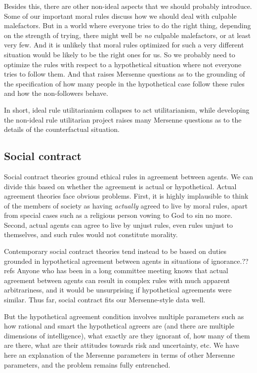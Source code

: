 Besides this, there are other non-ideal aspects that we should probably introduce. Some of our important moral rules discuss how
we should deal with culpable malefactors. But in a world where everyone tries to do the right thing, depending on the strength
of trying, there might well be \textit{no} culpable malefactors, or at least very few. And it is unlikely that moral rules optimized
for such a very different situation would be likely to be the right ones for us. So we probably need to optimize the rules with
respect to a hypothetical situation where not everyone tries to follow them. And that raises Mersenne questions as to 
the grounding of the specification of how many
people in the hypothetical case follow these rules and how the non-followers behave.

In short, ideal rule utilitarianism collapses to act utilitarianism, while developing the non-ideal rule utilitarian project raises many Mersenne questions as to the details of the counterfactual situation.

\subsection{Social contract}
Social contract theories ground ethical rules in agreement between agents.  We can divide this based on whether the agreement 
is actual or hypothetical. Actual agreement theories face obvious problems. First, it is highly implausible to think of the members of society as having \textit{actually} agreed to live by moral rules, apart from special cases such as a religious person vowing to God to sin no more. Second, actual agents can agree to live by unjust rules, even rules unjust to themselves,
and such rules would not constitute morality. 

Contemporary social contract theories tend instead to be based on duties grounded in hypothetical agreement between agents in situations of 
ignorance.??refs Anyone who has been in a long committee meeting knows that actual agreement between agents can result in 
complex rules with much apparent arbitrariness, and it would be unsurprising if hypothetical agreements were similar. Thus far, 
social contract fits our Mersenne-style data well. 

But the hypothetical agreement condition involves multiple parameters such as how rational and smart the hypothetical agreers are (and there are
multiple dimensions of intelligence), what exactly are they ignorant of, how many of them are there, what are their attitudes towards
risk and uncertainty, etc. 
We have here an explanation of the Mersenne parameters in terms of other Mersenne parameters, and the
problem remains fully entrenched. 

